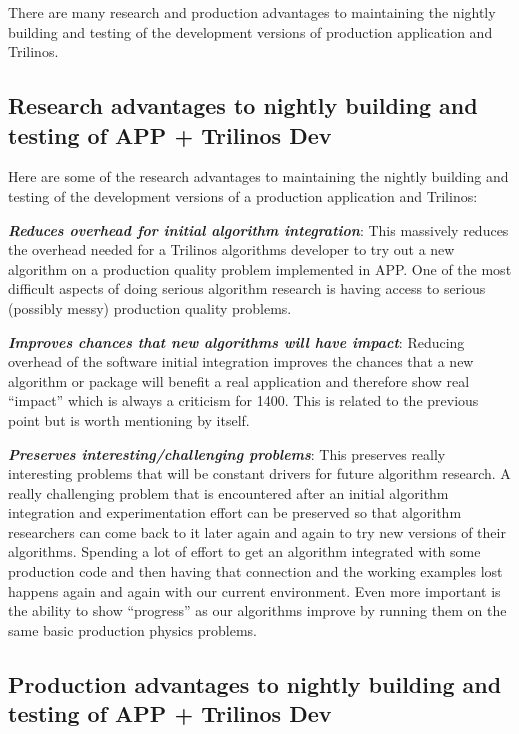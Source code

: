 \documentclass[pdf,ps2pdf,11pt]{SANDreport}
\begin{document}
There are many research and production advantages to maintaining the nightly
building and testing of the development versions of production application and
Trilinos.


%
{}\subsection{Research advantages to nightly building and testing of APP +
Trilinos Dev}
%

Here are some of the research advantages to maintaining the nightly building
and testing of the development versions of a production application and
Trilinos:

{}\textit{\textbf{Reduces overhead for initial algorithm integration}}: This
massively reduces the overhead needed for a Trilinos algorithms developer to
try out a new algorithm on a production quality problem implemented in APP.
One of the most difficult aspects of doing serious algorithm research is
having access to serious (possibly messy) production quality problems.

{}\textit{\textbf{Improves chances that new algorithms will have impact}}:
Reducing overhead of the software initial integration improves the chances
that a new algorithm or package will benefit a real application and therefore
show real ``impact'' which is always a criticism for 1400.  This is related to
the previous point but is worth mentioning by itself.

{}\textit{\textbf{Preserves interesting/challenging problems}}: This preserves
really interesting problems that will be constant drivers for future algorithm
research.  A really challenging problem that is encountered after an initial
algorithm integration and experimentation effort can be preserved so that
algorithm researchers can come back to it later again and again to try new
versions of their algorithms.  Spending a lot of effort to get an algorithm
integrated with some production code and then having that connection and the
working examples lost happens again and again with our current environment.
Even more important is the ability to show ``progress'' as our algorithms
improve by running them on the same basic production physics problems.


%
{}\subsection{Production advantages to nightly building and testing of APP +
Trilinos Dev}
%
\end{document}

